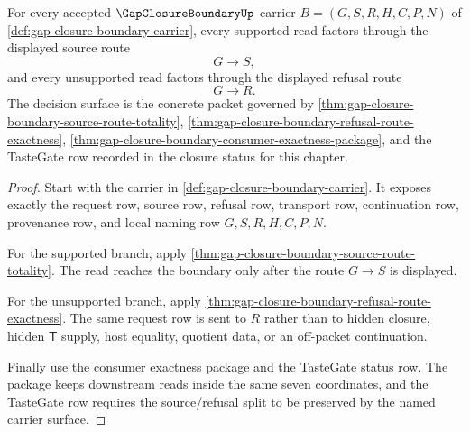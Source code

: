 \begin{theorem}
\label{thm:gap-closure-boundary-source-refusal-decision-surface}
For every accepted $\GapClosureBoundaryUp$ carrier $B=(G,S,R,H,C,P,N)$ of \autoref{def:gap-closure-boundary-carrier}, every supported read factors through the displayed source route
$$
G \longrightarrow S,
$$
and every unsupported read factors through the displayed refusal route
$$
G \longrightarrow R.
$$
The decision surface is the concrete packet governed by \autoref{thm:gap-closure-boundary-source-route-totality}, \autoref{thm:gap-closure-boundary-refusal-route-exactness}, \autoref{thm:gap-closure-boundary-consumer-exactness-package}, and the TasteGate row recorded in the closure status for this chapter.
\end{theorem}
\begin{proof}
Start with the carrier in \autoref{def:gap-closure-boundary-carrier}. It exposes exactly the request row, source row, refusal row, transport row, continuation row, provenance row, and local naming row $G,S,R,H,C,P,N$.

For the supported branch, apply \autoref{thm:gap-closure-boundary-source-route-totality}. The read reaches the boundary only after the route $G \longrightarrow S$ is displayed.

For the unsupported branch, apply \autoref{thm:gap-closure-boundary-refusal-route-exactness}. The same request row is sent to $R$ rather than to hidden closure, hidden $\mathsf{T}$ supply, host equality, quotient data, or an off-packet continuation.

Finally use the consumer exactness package and the TasteGate status row. The package keeps downstream reads inside the same seven coordinates, and the TasteGate row requires the source/refusal split to be preserved by the named carrier surface.
\end{proof}

